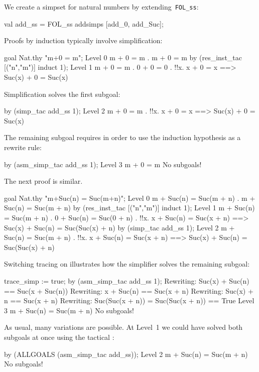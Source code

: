We create a simpset for natural numbers by extending~{\tt FOL_ss}:
\begin{ttbox}
val add_ss = FOL_ss addsimps [add_0, add_Suc];
\end{ttbox}
Proofs by induction typically involve simplification:
\begin{ttbox}
goal Nat.thy "m+0 = m";
{\out Level 0}
{\out m + 0 = m}
{. m + 0 = m}
\ttbreak
by (res_inst_tac [("n","m")] induct 1);
{\out Level 1}
{\out m + 0 = m}
{. 0 + 0 = 0}
{. !!x. x + 0 = x ==> Suc(x) + 0 = Suc(x)}
\end{ttbox}
Simplification solves the first subgoal:
\begin{ttbox}
by (simp_tac add_ss 1);
{\out Level 2}
{\out m + 0 = m}
{. !!x. x + 0 = x ==> Suc(x) + 0 = Suc(x)}
\end{ttbox}
The remaining subgoal requires  in order to use the
induction hypothesis as a rewrite rule:
\begin{ttbox}
by (asm_simp_tac add_ss 1);
{\out Level 3}
{\out m + 0 = m}
{\out No subgoals!}
\end{ttbox}

\medskip
The next proof is similar.
\begin{ttbox}
goal Nat.thy "m+Suc(n) = Suc(m+n)";
{\out Level 0}
{\out m + Suc(n) = Suc(m + n)}
{. m + Suc(n) = Suc(m + n)}
\ttbreak
by (res_inst_tac [("n","m")] induct 1);
{\out Level 1}
{\out m + Suc(n) = Suc(m + n)}
{. 0 + Suc(n) = Suc(0 + n)}
{. !!x. x + Suc(n) = Suc(x + n) ==> Suc(x) + Suc(n) = Suc(Suc(x) + n)}
\ttbreak
by (simp_tac add_ss 1);
{\out Level 2}
{\out m + Suc(n) = Suc(m + n)}
{. !!x. x + Suc(n) = Suc(x + n) ==> Suc(x) + Suc(n) = Suc(Suc(x) + n)}
\end{ttbox}
Switching tracing on illustrates how the simplifier solves the remaining
subgoal: 
\begin{ttbox}
trace_simp := true;
by (asm_simp_tac add_ss 1);
{\out Rewriting:}
{\out Suc(x) + Suc(n) == Suc(x + Suc(n))}
{\out Rewriting:}
{\out x + Suc(n) == Suc(x + n)}
{\out Rewriting:}
{\out Suc(x) + n == Suc(x + n)}
{\out Rewriting:}
{\out Suc(Suc(x + n)) = Suc(Suc(x + n)) == True}
{\out Level 3}
{\out m + Suc(n) = Suc(m + n)}
{\out No subgoals!}
\end{ttbox}
As usual, many variations are possible.  At Level~1 we could have solved
both subgoals at once using the tactical :
\begin{ttbox}
by (ALLGOALS (asm_simp_tac add_ss));
{\out Level 2}
{\out m + Suc(n) = Suc(m + n)}
{\out No subgoals!}
\end{ttbox}

